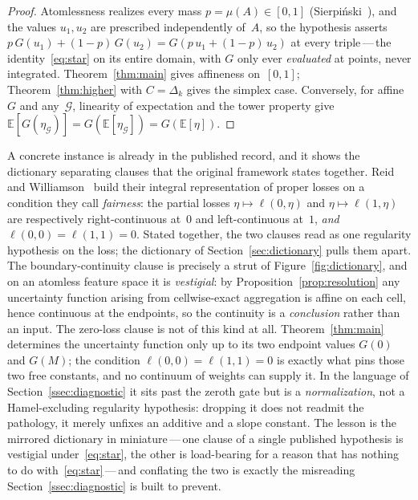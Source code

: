 \documentclass{article}
\theoremstyle{plain}
\theoremstyle{definition}
\newcommand{\E}{\mathbb{E}}
\begin{document}
\begin{proof}
Atomlessness realizes every mass $p=\mu(A)\in[0,1]$
(Sierpi\'nski~\cite{Sierpinski1922}), and the values $u_1,u_2$ are
prescribed independently of~$A$, so the hypothesis asserts
$p\,G(u_1)+(1-p)\,G(u_2)=G(p\,u_1+(1-p)\,u_2)$ at every
triple\,---\,the identity~\eqref{eq:star} on its entire domain, with
$G$ only ever \emph{evaluated} at points, never integrated.
Theorem~\ref{thm:main} gives affineness on~$[0,1]$;
Theorem~\ref{thm:higher} with $C=\Delta_k$ gives the simplex case.
Conversely, for affine~$G$ and any~$\mathcal{G}$, linearity of
expectation and the tower property give
$\E[G(\eta_{\mathcal{G}})]=G(\E[\eta_{\mathcal{G}}])=G(\E[\eta])$.
\end{proof}

A concrete instance is already in the published record, and it shows the
dictionary separating clauses that the original framework states together. Reid and
Williamson~\cite{ReidWilliamson2011} build their integral representation of
proper losses on a condition they call \emph{fairness}: the partial losses
$\eta\mapsto\ell(0,\eta)$ and $\eta\mapsto\ell(1,\eta)$ are respectively
right-continuous at~$0$ and left-continuous at~$1$, \emph{and}
$\ell(0,0)=\ell(1,1)=0$. Stated together, the two clauses read as one
regularity hypothesis on the loss; the dictionary of
Section~\ref{sec:dictionary} pulls them apart. The boundary-continuity clause
is precisely a strut of Figure~\ref{fig:dictionary}, and on an atomless
feature space it is \emph{vestigial}: by Proposition~\ref{prop:resolution}
any uncertainty function arising from cellwise-exact aggregation is affine on
each cell, hence continuous at the endpoints, so the continuity is a
\emph{conclusion} rather than an input. The zero-loss clause is not of this
kind at all. Theorem~\ref{thm:main} determines the uncertainty function only
up to its two endpoint values $G(0)$ and $G(M)$; the condition
$\ell(0,0)=\ell(1,1)=0$ is exactly what pins those two free constants, and no
continuum of weights can supply it. In the language of
Section~\ref{ssec:diagnostic} it sits past the zeroth gate but is a
\emph{normalization}, not a Hamel-excluding regularity hypothesis: dropping it
does not readmit the pathology, it merely unfixes an additive and a slope
constant. The lesson is the mirrored dictionary in miniature\,---\,one
clause of a single published hypothesis is vestigial under~\eqref{eq:star},
the other is load-bearing for a reason that has nothing to do
with~\eqref{eq:star}\,---\,and conflating the two is exactly the misreading
Section~\ref{ssec:diagnostic} is built to prevent.
\end{document}

